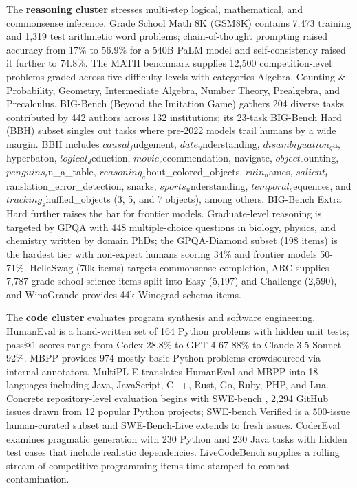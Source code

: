 \documentclass{article}
\begin{document}
The \textbf{reasoning cluster} stresses multi-step logical, mathematical, and commonsense inference. Grade School Math 8K (GSM8K) \cite{cobbe20212021} contains 7,473 training and 1,319 test arithmetic word problems; chain-of-thought prompting \cite{wei2022emergentabilitieso} raised accuracy from 17\% to 56.9\% for a 540B PaLM model and self-consistency raised it further to 74.8\%. The MATH benchmark \cite{hendrycks2021measuringmassivemu} supplies 12,500 competition-level problems graded across five difficulty levels with categories Algebra, Counting \& Probability, Geometry, Intermediate Algebra, Number Theory, Prealgebra, and Precalculus. BIG-Bench (Beyond the Imitation Game) \cite{srivastava20222022} gathers 204 diverse tasks contributed by 442 authors across 132 institutions; its 23-task BIG-Bench Hard (BBH) subset \cite{suzgun2022challengingbigbenc} singles out tasks where pre-2022 models trail humans by a wide margin. BBH includes \(causal_j\)udgement, \(date_u\)nderstanding, \(disambiguation_q\)a, hyperbaton, \(logical_d\)eduction, \(movie_r\)ecommendation, navigate, \(object_c\)ounting, \(penguins_i\)n\_a\_table, \(reasoning_a\)bout\_colored\_objects, \(ruin_n\)ames, \(salient_t\)ranslation\_error\_detection, snarks, \(sports_u\)nderstanding, \(temporal_s\)equences, and \(tracking_s\)huffled\_objects (3, 5, and 7 objects), among others. BIG-Bench Extra Hard \cite{kazemi20252025} further raises the bar for frontier models. Graduate-level reasoning is targeted by GPQA \cite{rein2024gpqaagraduatelevel} with 448 multiple-choice questions in biology, physics, and chemistry written by domain PhDs; the GPQA-Diamond subset (198 items) is the hardest tier with non-expert humans scoring 34\% and frontier models 50-71\%. HellaSwag \cite{zellers2019hellaswagcanamachi} (70k items) targets commonsense completion, ARC \cite{clark2018thinkyouhavesolved} supplies 7,787 grade-school science items split into Easy (5,197) and Challenge (2,590), and WinoGrande \cite{sakaguchi2020winograndeanadvers} provides 44k Winograd-schema items.

The \textbf{code cluster} evaluates program synthesis and software engineering. HumanEval \cite{chen20212021} is a hand-written set of 164 Python problems with hidden unit tests; pass@1 scores range from Codex 28.8\% to GPT-4 67-88\% to Claude 3.5 Sonnet 92\%. MBPP \cite{austin20212021} provides 974 mostly basic Python problems crowdsourced via internal annotators. MultiPL-E \cite{cassano20232023} translates HumanEval and MBPP into 18 languages including Java, JavaScript, C++, Rust, Go, Ruby, PHP, and Lua. Concrete repository-level evaluation begins with SWE-bench \cite{jimenez20242024}, 2,294 GitHub issues drawn from 12 popular Python projects; SWE-bench Verified is a 500-issue human-curated subset and SWE-Bench-Live extends to fresh issues. CoderEval \cite{yu20242024} examines pragmatic generation with 230 Python and 230 Java tasks with hidden test cases that include realistic dependencies. LiveCodeBench supplies a rolling stream of competitive-programming items time-stamped to combat contamination.
\end{document}
